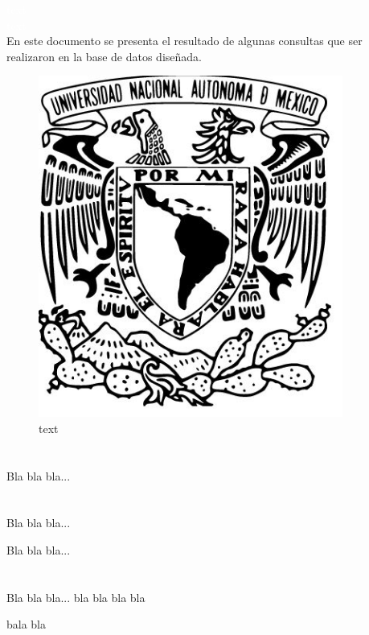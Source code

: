 \documentclass[12pt]{article}
\begin{document}
\title{}
	\author{}
	\date{}
\thispagestyle{miestilo}
\textcolor{white}{text}\\
\vspace{1cm}
\textcolor{white}{text}\\

En este documento se presenta el resultado de algunas consultas que ser realizaron en la base de datos diseñada. 
\begin{center}
\begin{figure}[H]
	\includegraphics[width=10cm]{logo_unam}	
	\caption{text}
\end{figure}
\end{center}



\newpage
\pagestyle{miestilo2}

\section{}
Bla bla bla...

\section{}


Bla bla bla...



Bla bla bla...

\section{}


Bla bla bla...
bla
bla
bla
bla
\vspace{30cm}

bala
bla
\end{document}
